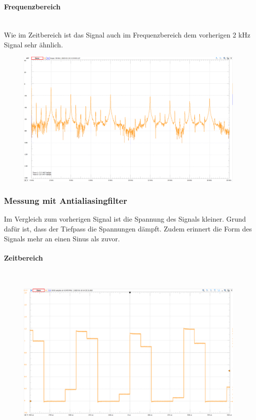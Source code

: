 \documentclass{article}
\begin{document}
\paragraph{Frequenzbereich}\mbox{}\\
Wie im Zeitbereich ist das Signal auch im Frequenzbereich dem vorherigen 2 kHz Signal sehr ähnlich.
\begin{figure}[h]
    \centering
    \includegraphics[width=0.8\linewidth]{img/Freq_09.png}
\end{figure}

\newpage
\subsubsection{Messung mit Antialiasingfilter}
Im Vergleich zum vorherigen Signal ist die Spannung des Signals kleiner. Grund dafür ist, dass der Tiefpass die Spannungen dämpft. Zudem erinnert die Form des Signals mehr an einen Sinus als zuvor.
\paragraph{Zeitbereich}\mbox{}\\
\begin{figure}[h]
    \centering
    \includegraphics[width=0.6\linewidth]{img/Signal_10.png}
\end{figure}
\end{document}
